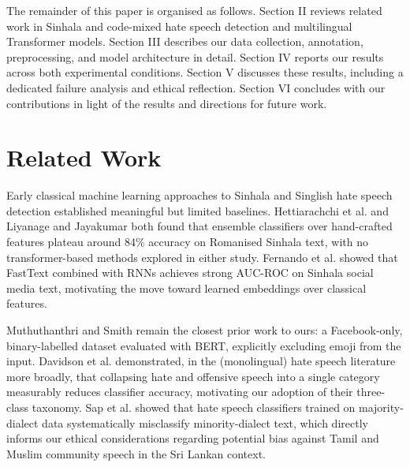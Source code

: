 \documentclass[journal]{IEEEtran}
\begin{document}
The remainder of this paper is organised as follows. Section II reviews
related work in Sinhala and code-mixed hate speech detection and
multilingual Transformer models. Section III describes our data
collection, annotation, preprocessing, and model architecture in detail.
Section IV reports our results across both experimental conditions.
Section V discusses these results, including a dedicated failure
analysis and ethical reflection. Section VI concludes with our
contributions in light of the results and directions for future work.


\section{Related Work}

Early classical machine learning approaches to Sinhala and Singlish hate
speech detection established meaningful but limited baselines.
Hettiarachchi et al. \cite{hettiarachchi2020} and Liyanage and Jayakumar
\cite{liyanage2021} both found that ensemble classifiers over
hand-crafted features plateau around 84\% accuracy on Romanised Sinhala
text, with no transformer-based methods explored in either study.
Fernando et al. \cite{fernando2022} showed that FastText combined with
RNNs achieves strong AUC-ROC on Sinhala social media text, motivating the
move toward learned embeddings over classical features.

Muthuthanthri and Smith \cite{muthuthanthri2024} remain the closest prior
work to ours: a Facebook-only, binary-labelled dataset evaluated with
BERT, explicitly excluding emoji from the input. Davidson et al.
\cite{davidson2017} demonstrated, in the (monolingual) hate speech
literature more broadly, that collapsing hate and offensive speech into
a single category measurably reduces classifier accuracy, motivating our
adoption of their three-class taxonomy. Sap et al. \cite{sap2019} showed
that hate speech classifiers trained on majority-dialect data
systematically misclassify minority-dialect text, which directly informs
our ethical considerations regarding potential bias against Tamil and
Muslim community speech in the Sri Lankan context.
\end{document}
